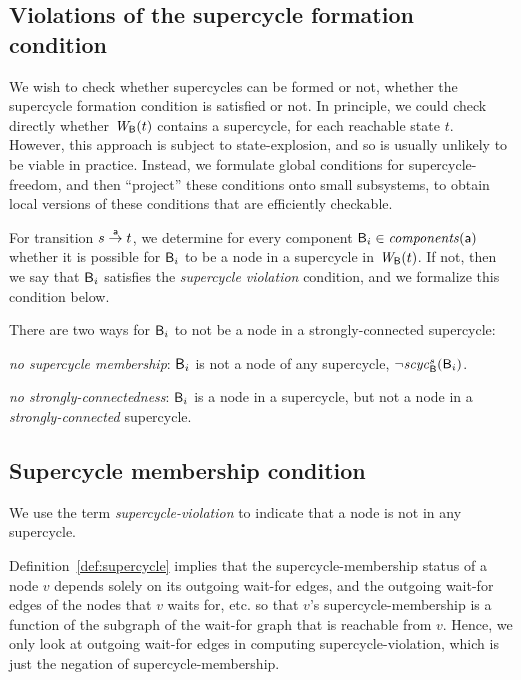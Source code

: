 \subsection{Violations of the supercycle formation condition}

We wish to check whether supercycles can be formed or not, \ie whether the supercycle formation
condition is satisfied or not. In principle, we could check directly
whether $\wfg{\B}{t}$ contains a supercycle, for each reachable state
$t$. However, this approach is subject to state-explosion, and so is usually unlikely to be viable in practice.
Instead, we formulate global conditions for supercycle-freedom, and then ``project'' these
conditions onto small subsystems, to obtain local versions of these conditions that are efficiently checkable.

For transition $s \goesto[\act] t$, we determine for every component $\B_i \in \cmps{\act}$ whether
it is possible for $\B_i$ to be a node in a supercycle in $\wfg{\B}{t}$. 
 If not, then we say that $\B_i$ satisfies the \emph{supercycle
  violation} condition, and we formalize this condition below.

There are two ways for $\B_i$ to not be a node in a strongly-connected supercycle:
\bn
\item \textit{no supercycle membership}: $\B_i$ is not a node of any supercycle, \ie $\neg \scyc{\B}{s}{\B_i}$.

\item \textit{no strongly-connectedness}: $\B_i$ is a node in a supercycle, but not a node in a \emph{strongly-connected} supercycle. 

\en





\subsection{Supercycle membership condition}

We use the term \emph{supercycle-violation} to indicate that a node is not in any supercycle. 

Definition~\ref{def:supercycle} implies that the supercycle-membership status of a node $v$ depends
solely on its outgoing wait-for edges, and the outgoing wait-for edges of the nodes that $v$ waits
for, etc. so that $v$'s supercycle-membership is a function of the subgraph of the wait-for graph
that is reachable from $v$.  Hence, we only look at outgoing wait-for edges in computing
supercycle-violation, which is just the negation of supercycle-membership.

